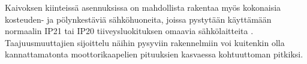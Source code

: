 \documentclass[finnish,12pt,a4paper,pdftex,elec,utf8]{aaltothesis}
\begin{document}
Kaivoksen kiinteissä asennuksissa on mahdollista rakentaa myös kokonaisia kosteuden- ja pölynkestäviä sähköhuoneita, joissa pystytään käyttämään normaalin IP21 tai IP20 tiiveysluokituksen omaavia sähkölaitteita \cite[s.253]{Hakapää}. Taajuusmuuttajien sijoittelu näihin pysyviin rakennelmiin voi kuitenkin olla kannattamatonta moottorikaapelien pituuksien kasvaessa kohtuuttoman pitkiksi.








\end{document}
